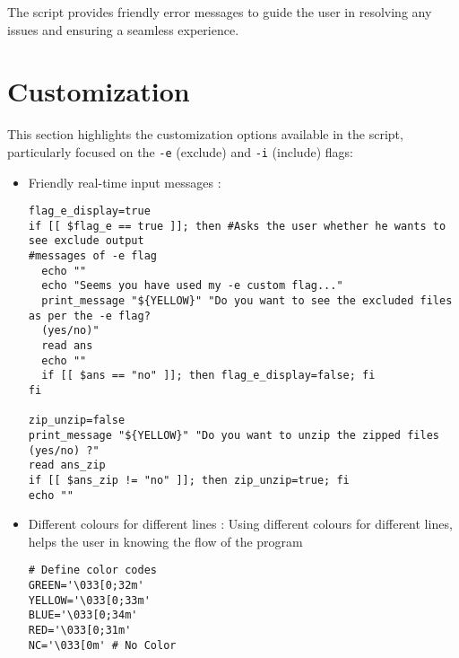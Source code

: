\documentclass{article}
\begin{document}
The script provides friendly error messages to guide the user in resolving any issues and ensuring a seamless experience.

\section{Customization}

This section highlights the customization options available in the script, particularly focused on the \texttt{-e} (exclude) and \texttt{-i} (include) flags:

\begin{itemize}
  \item Friendly real-time input messages :
    \begin{verbatim}
flag_e_display=true
if [[ $flag_e == true ]]; then #Asks the user whether he wants to see exclude output
#messages of -e flag
  echo ""
  echo "Seems you have used my -e custom flag..."
  print_message "${YELLOW}" "Do you want to see the excluded files as per the -e flag?
  (yes/no)"
  read ans
  echo ""
  if [[ $ans == "no" ]]; then flag_e_display=false; fi
fi

zip_unzip=false
print_message "${YELLOW}" "Do you want to unzip the zipped files (yes/no) ?"
read ans_zip
if [[ $ans_zip != "no" ]]; then zip_unzip=true; fi
echo ""
  \end{verbatim}
  \item Different colours for different lines : Using different colours for different lines, helps the user in knowing the flow of the program
  \begin{verbatim}
# Define color codes
GREEN='\033[0;32m'
YELLOW='\033[0;33m'
BLUE='\033[0;34m'
RED='\033[0;31m'
NC='\033[0m' # No Color


\end{verbatim}
\end{itemize}
\end{document}
